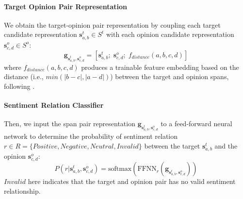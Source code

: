 \documentclass[11pt,a4paper]{article}
\begin{document}
\paragraph{Target Opinion Pair Representation}


We obtain the target-opinion pair representation by coupling each target candidate representation $\mathbf{s}_{a,b}^t \in S^t$ with each opinion candidate representation $\mathbf{s}_{c,d}^o \in S^o$:
\begin{equation}
\label{pair_concat}
\mathbf{g}_{\mathbf{s}_{a,b}^t, \mathbf{s}^o_{c,d}} = [\mathbf{s}_{a,b}^t; \;\mathbf{s}^o_{c,d};
\;f_{distance}(a, b, c, d)
]
\end{equation} 
where $f_{distance}(a, b, c, d)$ produces a trainable feature embedding based on the distance (i.e., $min(|b-c|, |a-d|)$) between the target and opinion spans, following \cite{lee-etal-2017-end, he-etal-2018-jointly,Xu2020PositionAwareTF}.



\paragraph{Sentiment Relation Classifier}
Then, we input the span pair representation $\mathbf{g}_{\mathbf{s}_{a,b}^t, \mathbf{s}^o_{c,d}}$ to a feed-forward neural network to determine the probability of sentiment relation $r \in R=\{Positive, Negative, Neutral, Invalid\}$ between the target $\mathbf{s}_{a,b}^t$ and the opinion $\mathbf{s}_{c,d}^o$:
\begin{equation}
\label{pair_classifier}
P(r|\mathbf{s}_{a,b}^t, \mathbf{s}^o_{c,d}) = 
\mathrm{softmax}(\mathrm{FFNN}_{r} (\mathbf{g}_{\mathbf{s}_{a,b}^t, \mathbf{s}^o_{c,d}}))
\end{equation}
$Invalid$ here indicates that the target and opinion pair has no valid sentiment relationship.
\end{document}
